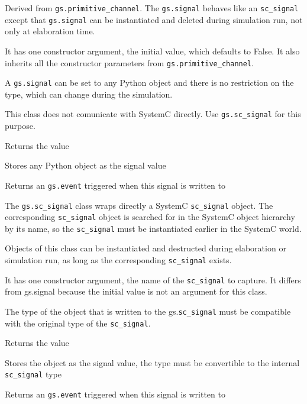 \documentclass[12pt,oneside]{gsbook}
\begin{document}
 {Derived from \texttt{gs.primitive\_channel}.  The
\texttt{gs.signal} behaves like an \texttt{sc\_signal} except that
\texttt{gs.signal} can be instantiated and deleted during simulation
run, not only at elaboration time.

It has one constructor argument, the initial value, which defaults to
False.  It also inherits all the constructor parameters from
\texttt{gs.primitive\_channel}.

A \texttt{gs.signal} can be set to any Python object and there is no
restriction on the type, which can change during the simulation.

This class does not comunicate with SystemC directly. Use
\texttt{gs.sc\_signal} for this purpose.}

\begin{methods}

 {Returns the value}

 {Stores any Python object as the signal value}

 {Returns an \texttt{gs.event} triggered when
this signal is written to}

\end{methods}



 {The \texttt{gs.sc\_signal} class wraps
directly a SystemC \texttt{sc\_signal} object. The corresponding
\texttt{sc\_signal} object is searched for in the SystemC object hierarchy
by its name, so the \texttt{sc\_signal} must be
instantiated earlier in the SystemC world.

Objects of this class can be instantiated and destructed during elaboration or
simulation run, as long as the corresponding \texttt{sc\_signal}
exists.

It has one constructor argument, the name of the \texttt{sc\_signal}
to capture. It differs from gs.signal because the initial value is not
an argument for this class.

The type of the object that is written to the gs.\texttt{sc\_signal}
must be compatible with the original type of the \texttt{sc\_signal}.}

\begin{methods}

 {Returns the value}

 {Stores the object as the signal value, the
type must be convertible to the internal \texttt{sc\_signal} type}

 {Returns an \texttt{gs.event} triggered when
this signal is written to}

\end{methods}
\end{document}
